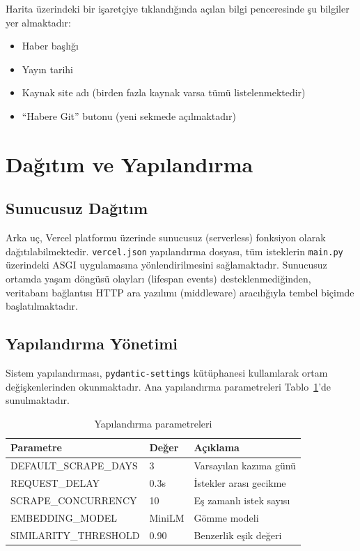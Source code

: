 \documentclass[conference]{IEEEtran}
\begin{document}
Harita üzerindeki bir işaretçiye tıklandığında açılan bilgi penceresinde şu bilgiler yer almaktadır:
\begin{itemize}[leftmargin=*]
    \item Haber başlığı
    \item Yayın tarihi
    \item Kaynak site adı (birden fazla kaynak varsa tümü listelenmektedir)
    \item ``Habere Git'' butonu (yeni sekmede açılmaktadır)
\end{itemize}

\section{Dağıtım ve Yapılandırma}
\label{sec:deployment}

\subsection{Sunucusuz Dağıtım}

Arka uç, Vercel platformu üzerinde sunucusuz (serverless) fonksiyon olarak dağıtılabilmektedir. \texttt{vercel.json} yapılandırma dosyası, tüm isteklerin \texttt{main.py} üzerindeki ASGI uygulamasına yönlendirilmesini sağlamaktadır. Sunucusuz ortamda yaşam döngüsü olayları (lifespan events) desteklenmediğinden, veritabanı bağlantısı HTTP ara yazılımı (middleware) aracılığıyla tembel biçimde başlatılmaktadır.

\subsection{Yapılandırma Yönetimi}

Sistem yapılandırması, \texttt{pydantic-settings} kütüphanesi kullanılarak ortam değişkenlerinden okunmaktadır. Ana yapılandırma parametreleri Tablo~\ref{tab:config}'de sunulmaktadır.

\begin{table}[H]
\centering
\caption{Yapılandırma parametreleri}
\label{tab:config}
\begin{tabular}{@{}p{3cm}p{1cm}p{3.2cm}@{}}
\toprule
\textbf{Parametre} & \textbf{Değer} & \textbf{Açıklama} \\
\midrule
DEFAULT\_SCRAPE\_DAYS & 3 & Varsayılan kazıma günü \\
REQUEST\_DELAY & 0.3s & İstekler arası gecikme \\
SCRAPE\_CONCURRENCY & 10 & Eş zamanlı istek sayısı \\
EMBEDDING\_MODEL & MiniLM & Gömme modeli \\
SIMILARITY\_THRESHOLD & 0.90 & Benzerlik eşik değeri \\
\bottomrule
\end{tabular}
\end{table}
\end{document}

